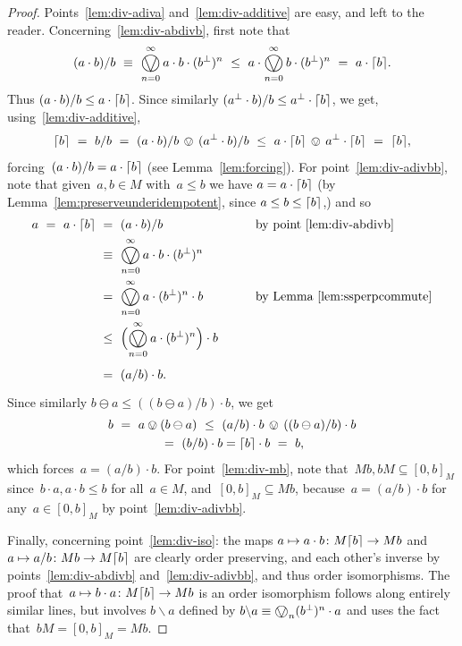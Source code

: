 \documentclass[10pt,conference]{IEEEtran}
\DeclarePairedDelimiter{\ceil}{\lceil}{\rceil}
\theoremstyle{definition}
\newcommand{\bigovee}{\mathop{\vphantom{\sum}\mathchoice%
        {\vcenter{\hbox{\huge $\ovee$}}}%
        {\vcenter{\hbox{\Large $\ovee$}}}%
        {\ovee}{\ovee}}\displaylimits}
\begin{document}
\begin{proof}
    Points~\ref{lem:div-adiva} and~\ref{lem:div-additive} are easy,
and left to the reader.
Concerning~\ref{lem:div-abdivb},
first note that
\begin{equation*}
    (a\cdot b)/b\ \equiv\ 
    \bigovee_{n=0}^\infty a \cdot b \cdot (b^\perp)^n
\ \leq\ 
    a \cdot \bigovee_{n=0}^\infty b \cdot (b^\perp)^n
    \ = \ a\cdot \ceil{b}.
\end{equation*}
Thus $(a \cdot b)/b\leq a\cdot \ceil{b}$.
    Since similarly $(a^\perp \cdot b)/b\leq a^\perp\cdot \ceil{b}$,
    we get, using~\ref{lem:div-additive},
\begin{equation*}
\ceil{b}\ = \ 
b/b\ = \ 
    (a\cdot b)/b\,\ovee\,(a^\perp \cdot b)/b
    \ \leq\ a\cdot \ceil{b}\,\ovee\,a^\perp \cdot\ceil{b}
    \ =\ \ceil{b},
\end{equation*}
forcing~$(a\cdot b)/b = a\cdot \ceil{b}$
    (see Lemma~\ref{lem:forcing}).
For point~\ref{lem:div-adivbb},
note that given~$a,b \in M$ with~$a \leq b$
we have
    $a=a\cdot \ceil{b}$ (by Lemma~\ref{lem:preserveunderidempotent}, 
    since $a\leq b\leq \ceil{b}$,) and so
    \begin{alignat*}{3}
        a 
         \ =\ a\cdot \ceil{b} 
        & \ =\ (a\cdot b)/b &\qquad& \text{by point~\ref{lem:div-abdivb}}\\
        & \ \equiv\  \bigovee_{n=0}^\infty  a\cdot b\cdot (b^\perp)^n \\
        & \ =\  \bigovee_{n=0}^\infty a\cdot (b^\perp)^n \cdot b 
                    && \text{by Lemma~\ref{lem:ssperpcommute}} \\
        & \ \leq\  \Bigl(\bigovee_{n=0}^\infty a\cdot (b^\perp)^n\Bigr) \cdot b  \\
        & \ =\ (a/b)\cdot b.
    \end{alignat*}
    Since similarly $b\ominus a\leq ((b\ominus a)/b)\cdot b$,
    we get
\begin{multline*}
    b\ =\ a\ovee (b\ominus a) 
    \ \leq\ 
    (a/b)\cdot b\,\ovee\,((b\ominus a)/b)\cdot b \\
     \ =\ (b/b)\cdot b =\ceil{b}\cdot b\ =\ b,
\end{multline*}
which forces~$a=(a/b)\cdot b$.
For point~\ref{lem:div-mb},
    note that~$Mb, bM\subseteq [0,b]_M$
    since~$b\cdot a, a\cdot b\leq b$ for all~$a\in M$,
    and~$[0,b]_M\subseteq Mb$,
    because~$a=(a/b)\cdot b$ for any~$a\in [0,b]_M$
    by point~\ref{lem:div-adivbb}.

Finally, 
concerning
    point~\ref{lem:div-iso}:
    the maps 
     $a\mapsto a\cdot b\colon M \ceil{b}
    \to M b$
and  $a\mapsto a/b\colon M b
    \to M \ceil{b}$
    are clearly order preserving,
    and each other's inverse
    by points~\ref{lem:div-abdivb} and~\ref{lem:div-adivbb},
    and thus order isomorphisms.
    The proof that~$a\mapsto b\cdot a\colon M \ceil{b} \to M b$
    is an order isomorphism follows along entirely similar lines,
    but involves $b\backslash a$ defined by 
    $b\backslash a\equiv \bigovee_n (b^\perp)^n \cdot a$
    and uses the fact that~$bM = [0,b]_M = M b$.
\end{proof}
\end{document}
